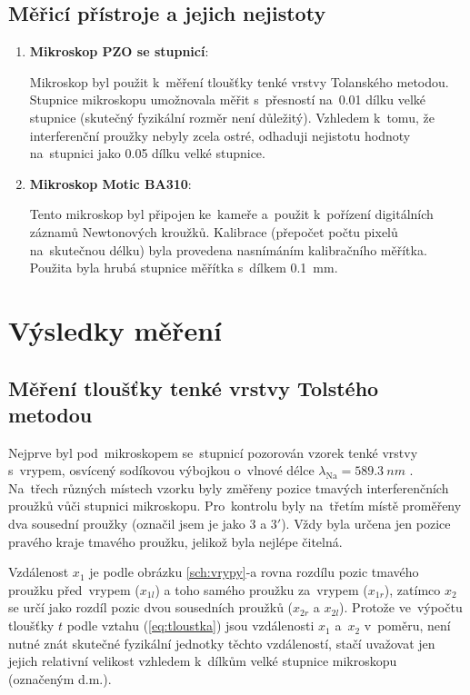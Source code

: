 \documentclass{../concepts/titul_protokol_p/prepareprotokol} %
\begin{document}
\subsection{Měřicí přístroje a jejich nejistoty}
\begin{enumerate}
    \item \textbf{Mikroskop PZO se stupnicí}:
    
    Mikroskop byl použit k~měření tloušťky tenké vrstvy Tolanského metodou. Stupnice mikroskopu
    umožnovala měřit s~přesností na~0.01 dílku velké stupnice (skutečný fyzikální rozměr není důležitý).
    Vzhledem k~tomu, že interferenční proužky nebyly zcela ostré, odhaduji nejistotu hodnoty na~stupnici
    jako 0.05 dílku velké stupnice.

    \item \textbf{Mikroskop Motic BA310}:
    
    Tento mikroskop byl připojen ke~kameře a~použit k~pořízení digitálních záznamů Newtonových kroužků.
    Kalibrace (přepočet počtu pixelů na~skutečnou délku) byla provedena nasnímáním kalibračního měřítka.
    Použita byla hrubá stupnice měřítka s~dílkem \qty{0.1}{\mm}.

\end{enumerate}


\section{Výsledky měření}

\subsection{Měření tloušťky tenké vrstvy Tolstého metodou}

Nejprve byl pod~mikroskopem se~stupnicí pozorován vzorek tenké vrstvy s~vrypem, osvícený sodíkovou výbojkou o~vlnové
délce $\lambda_\mathrm{Na} = \qty{589.3}{nm}$ \cite{vlnovedelky}. Na~třech různých místech vzorku byly
změřeny pozice tmavých interferenčních proužků vůči stupnici mikroskopu. Pro~kontrolu byly na~třetím místě
proměřeny dva sousední proužky (označil jsem je jako $3$ a $3'$). Vždy byla určena jen pozice pravého 
kraje tmavého proužku, jelikož byla nejlépe čitelná. 

Vzdálenost $x_1$ je podle obrázku \ref{sch:vrypy}-a rovna
rozdílu pozic tmavého proužku před~vrypem ($x_{1l}$) a toho samého proužku za~vrypem ($x_{1r}$), zatímco $x_2$
se určí jako rozdíl pozic dvou sousedních proužků ($x_{2r}$ a $x_{2l}$).
Protože ve~výpočtu tloušťky $t$
podle vztahu (\ref{eq:tloustka}) jsou vzdálenosti $x_1$ a~$x_2$ v~poměru, není nutné znát skutečné
fyzikální jednotky těchto vzdáleností, stačí uvažovat jen jejich relativní velikost vzhledem
k~dílkům velké stupnice mikroskopu (označeným d.m.).
\end{document}
